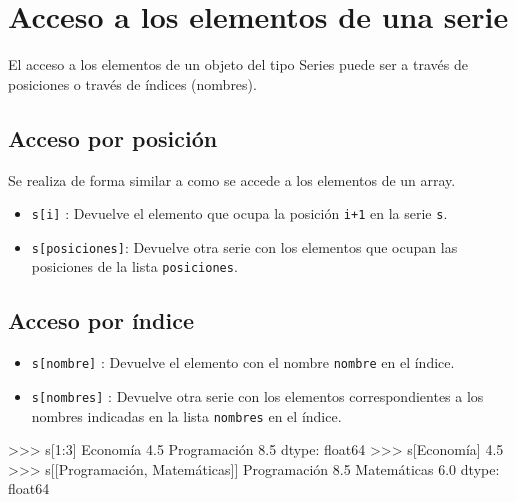 \documentclass[
  spanish,
  a4paper,
]{scrreport}
\newenvironment{Shaded}{\begin{snugshade}}{\end{snugshade}}
\newcommand{\DecValTok}[1]{\textcolor[rgb]{0.68,0.00,0.00}{#1}}
\newcommand{\FloatTok}[1]{\textcolor[rgb]{0.68,0.00,0.00}{#1}}
\newcommand{\NormalTok}[1]{\textcolor[rgb]{0.00,0.23,0.31}{#1}}
\newcommand{\OperatorTok}[1]{\textcolor[rgb]{0.37,0.37,0.37}{#1}}
\newcommand{\StringTok}[1]{\textcolor[rgb]{0.13,0.47,0.30}{#1}}
\providecommand{\tightlist}{%
  \setlength{\itemsep}{0pt}\setlength{\parskip}{0pt}}
\begin{document}
\section{Acceso a los elementos de una
serie}\label{acceso-a-los-elementos-de-una-serie}

El acceso a los elementos de un objeto del tipo Series puede ser a
través de posiciones o través de índices (nombres).

\subsection{Acceso por posición}\label{acceso-por-posiciuxf3n}

Se realiza de forma similar a como se accede a los elementos de un
array.

\begin{itemize}
\tightlist
\item
  \texttt{s{[}i{]}} : Devuelve el elemento que ocupa la posición
  \texttt{i+1} en la serie \texttt{s}.
\item
  \texttt{s{[}posiciones{]}}: Devuelve otra serie con los elementos que
  ocupan las posiciones de la lista \texttt{posiciones}.
\end{itemize}

\subsection{Acceso por índice}\label{acceso-por-uxedndice}

\begin{itemize}
\tightlist
\item
  \texttt{s{[}nombre{]}} : Devuelve el elemento con el nombre
  \texttt{nombre} en el índice.
\item
  \texttt{s{[}nombres{]}} : Devuelve otra serie con los elementos
  correspondientes a los nombres indicadas en la lista \texttt{nombres}
  en el índice.
\end{itemize}

\begin{Shaded}
\begin{Highlighting}[]
\OperatorTok{\textgreater{}\textgreater{}\textgreater{}}\NormalTok{ s[}\DecValTok{1}\NormalTok{:}\DecValTok{3}\NormalTok{]}
\NormalTok{Economía        }\FloatTok{4.5}
\NormalTok{Programación    }\FloatTok{8.5}
\NormalTok{dtype: float64}
\OperatorTok{\textgreater{}\textgreater{}\textgreater{}}\NormalTok{ s[}\StringTok{\textquotesingle{}Economía\textquotesingle{}}\NormalTok{]}
\FloatTok{4.5}
\OperatorTok{\textgreater{}\textgreater{}\textgreater{}}\NormalTok{ s[[}\StringTok{\textquotesingle{}Programación\textquotesingle{}}\NormalTok{, }\StringTok{\textquotesingle{}Matemáticas\textquotesingle{}}\NormalTok{]]}
\NormalTok{Programación    }\FloatTok{8.5}
\NormalTok{Matemáticas     }\FloatTok{6.0}
\NormalTok{dtype: float64}
\end{Highlighting}
\end{Shaded}
\end{document}
